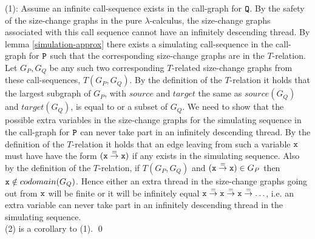 \documentclass{LMCS}
\newcommand{\bprf}{\proof}
\newcommand{\eprf}{\qed}
\theoremstyle{definition}\newtheorem{env}[thm]{Environment}
\begin{document}
\bprf 
(1): Assume an infinite call-sequence 
exists in the call-graph for ${\tt Q}$. By the safety of the size-change graphs in the pure $\lambda$-calculus, the size-change graphs associated with this call sequence cannot have an infinitely descending thread. By lemma \ref{simulation-approx} there exists a simulating call-sequence in the call-graph for ${\tt P}$ such that  the corresponding size-change graphs are in the $T$-relation. 
Let $G_P,G_Q $ be any such two corresponding $T$-related size-change graphs from these call-sequences, $T(G_P,G_Q)$. 
By the definition of the $T$-relation it holds that the largest subgraph of $G_P$, with $source$ and $target$ the same as  $source(G_Q)$ and $target(G_Q)$,  is equal to or a subset of $G_Q$. 
 We need to show that the possible extra variables in the size-change graphs for the simulating sequence in the call-graph for ${\tt P}$ can never take part in an infinitely descending thread. By the definition of the $T$-relation it holds that 
an edge leaving from such a variable ${\tt x}$ must have have the form $({\tt x}\stackrel{=}{\to}{\tt x})$ if any exists in the simulating sequence. Also by the definition of the $T$-relation, if $T(G_P,G_Q)$ and $({\tt x}\stackrel{=}{\to}{\tt x})\in G_P$ then ${\tt x}\notin codomain(G_Q)$. Hence either an extra thread in the size-change graphs going out from ${\tt x}$ will be finite or it will be infinitely equal ${\tt x}\stackrel{=}{\to}{\tt x}\stackrel{=}{\to}{\tt x}\stackrel{=}{\to}\ldots$, i.e. an extra variable can never take part in an infinitely descending thread in the simulating sequence.\\
(2) is a corollary to (1).
\eprf
\end{document}
